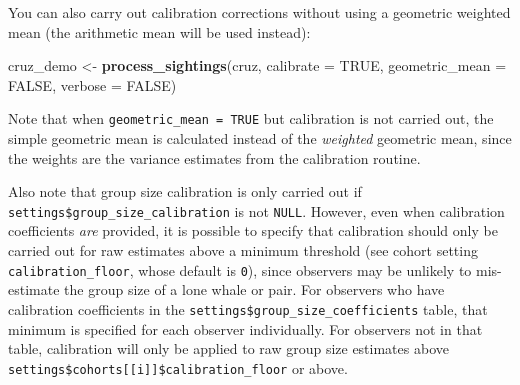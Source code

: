 \documentclass[
]{book}
\newenvironment{Shaded}{\begin{snugshade}}{\end{snugshade}}
\newcommand{\AttributeTok}[1]{\textcolor[rgb]{0.13,0.29,0.53}{#1}}
\newcommand{\ConstantTok}[1]{\textcolor[rgb]{0.56,0.35,0.01}{#1}}
\newcommand{\DecValTok}[1]{\textcolor[rgb]{0.00,0.00,0.81}{#1}}
\newcommand{\FloatTok}[1]{\textcolor[rgb]{0.00,0.00,0.81}{#1}}
\newcommand{\FunctionTok}[1]{\textcolor[rgb]{0.13,0.29,0.53}{\textbf{#1}}}
\newcommand{\NormalTok}[1]{#1}
\newcommand{\OtherTok}[1]{\textcolor[rgb]{0.56,0.35,0.01}{#1}}
\newcommand{\SpecialCharTok}[1]{\textcolor[rgb]{0.81,0.36,0.00}{\textbf{#1}}}
\begin{document}
You can also carry out calibration corrections without using a geometric weighted mean (the arithmetic mean will be used instead):

\begin{Shaded}
\begin{Highlighting}[]
\NormalTok{cruz\_demo }\OtherTok{\textless{}{-}} \FunctionTok{process\_sightings}\NormalTok{(cruz, }
                               \AttributeTok{calibrate =} \ConstantTok{TRUE}\NormalTok{,}
                               \AttributeTok{geometric\_mean =} \ConstantTok{FALSE}\NormalTok{,}
                               \AttributeTok{verbose =} \ConstantTok{FALSE}\NormalTok{)}
\end{Highlighting}
\end{Shaded}

\begin{Shaded}
\end{Shaded}

Note that when \texttt{geometric\_mean\ =\ TRUE} but calibration is not carried out, the simple geometric mean is calculated instead of the \emph{weighted} geometric mean, since the weights are the variance estimates from the calibration routine.

Also note that group size calibration is only carried out if \texttt{settings\$group\_size\_calibration} is not \texttt{NULL}. However, even when calibration coefficients \emph{are} provided, it is possible to specify that calibration should only be carried out for raw estimates above a minimum threshold (see cohort setting \texttt{calibration\_floor}, whose default is \texttt{0}), since observers may be unlikely to mis-estimate the group size of a lone whale or pair. For observers who have calibration coefficients in the \texttt{settings\$group\_size\_coefficients} table, that minimum is specified for each observer individually. For observers not in that table, calibration will only be applied to raw group size estimates above \texttt{settings\$cohorts{[}{[}i{]}{]}\$calibration\_floor} or above.
\end{document}
